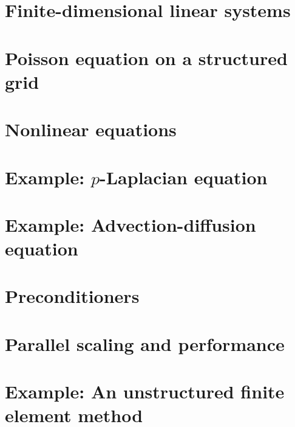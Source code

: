 \documentclass{tufte-book}
\newcommand{\CODELOC}{}  %
\newcommand{\stubinput}[2]{}
\newcommand{\stubinput}[2]{\vspace{5cm} \centerline{\LARGE Percent completed:  \Huge #2\%.} \vfill}
\theoremstyle{definition}
\begin{document}
\chapter{Finite-dimensional linear systems}
\label{chap:ls}
\renewcommand{\CODELOC}{ch2/}


\chapter{Poisson equation on a structured grid}
\label{chap:st}
\renewcommand{\CODELOC}{ch3/}


\chapter{Nonlinear equations}
\label{chap:nl}
\renewcommand{\CODELOC}{ch4/}


\chapter{Example: $p$-Laplacian equation}
\label{chap:of}
\renewcommand{\CODELOC}{ch5/}


\chapter{Example: Advection-diffusion equation}
\label{chap:ad}
\renewcommand{\CODELOC}{ch6/}


\chapter{Preconditioners}
\label{chap:pr}
\stubinput{chaps/precond.tex}{10}


\chapter{Parallel scaling and performance}
\label{chap:sc}
\renewcommand{\CODELOC}{ch8/}


\chapter{Example: An unstructured finite element method}
\label{chap:un}
\renewcommand{\CODELOC}{ch9/}

\end{document}
